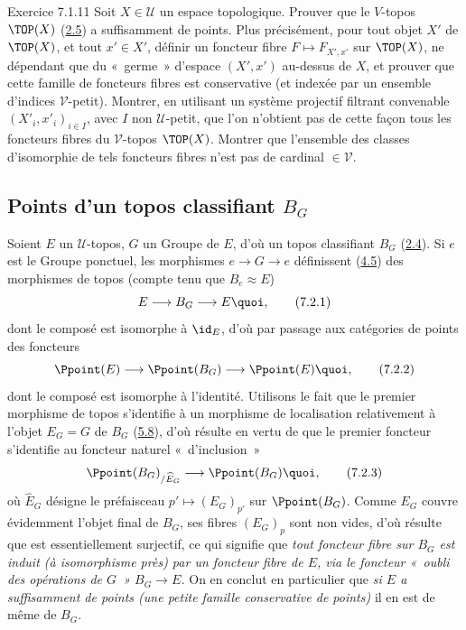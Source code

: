 \documentclass[10pt]{../fichiers-configuration-latex/smfart}
\begin{document}
\begin{enonce*}[remark]{Exercice 7.1.11}
Soit $X\in 𝒰$ un espace topologique. Prouver que le
$V$-topos $\TOP(X)$ (\hyperref[IV.subsec2.5]{2.5}) a suffisamment de points.
Plus précisément, pour tout objet $X'$ de $\TOP(X)$, et tout $x'\in
X'$, définir un foncteur fibre $F\mapsto F_{X',x'}$ sur $\TOP(X)$,
ne dépendant que du « germe » d'espace $(X',x')$ au-dessus de
$X$, et prouver que cette famille de foncteurs fibres est
conservative (et indexée par un ensemble d'indices
$𝒱$-petit). Montrer, en utilisant un système projectif
filtrant convenable $(X'_i,x'_i)_{i\in I}$, avec $I$ non
$𝒰$-petit, que l'on n'obtient pas de cette façon tous les
foncteurs fibres du $𝒱$-topos $\TOP(X)$. Montrer que
l'ensemble des classes d'isomorphie de tels foncteurs fibres n'est
pas de cardinal $\in 𝒱$.
\end{enonce*}

\subsection{Points d'un topos classifiant
  $B_G$}\pageoriginale

Soient $E$ un $𝒰$-topos, $G$ un Groupe de $E$, d'où un topos
classifiant $B_G$ (\hyperref[IV.subsec2.4]{2.4}). Si $e$ est le Groupe
ponctuel, les morphismes $e\rightarrow G\rightarrow e$ définissent
(\hyperref[IV.subsec4.5]{4.5}) des morphismes de topos (compte tenu que
$B_e\approx E$)
\begin{equation*}
E\longrightarrow B_G \longrightarrow E{\quoi},\tag{7.2.1}
\end{equation*}
dont le composé est isomorphe à $\id_E$, d'où par passage aux
catégories de points des foncteurs
\begin{equation*}
\Ppoint(E)\longrightarrow \Ppoint(B_G)\longrightarrow
\Ppoint(E){\quoi},\tag{7.2.2}
\end{equation*}
dont le composé est isomorphe à l'identité. Utilisons le fait que le
premier morphisme de topos  s'identifie à un morphisme
de localisation relativement à l'objet $E_G=G$ de $B_G$
(\hyperref[IV.subsec5.8]{5.8}), d'où résulte en vertu de  que le
premier foncteur  s'identifie au foncteur naturel « d'inclusion »
\begin{equation*}
\Ppoint(B_G)_{/\widehat{E}_G}\longrightarrow
\Ppoint(B_G){\quoi},\tag{7.2.3}
\end{equation*}
où $\widehat{E}_G$ désigne le préfaisceau $p'\mapsto (E_G)_{p'}$ sur
$\Ppoint(B_G)$. Comme $E_G$ couvre évidemment l'objet final de
$B_G$, ses fibres $(E_G)_p$ sont non vides, d'où résulte que
 est essentiellement surjectif, ce qui signifie que
\emph{tout foncteur fibre sur $B_G$ est induit (à isomorphisme près)
par un foncteur fibre de $E$, via le foncteur « oubli des
opérations de $G$ » $B_G\rightarrow E$.} On en conclut en
particulier que \emph{si $E$ a suffisamment de points (\resp une
petite famille conservative de points)} il en est de même de $B_G$.
\end{document}
